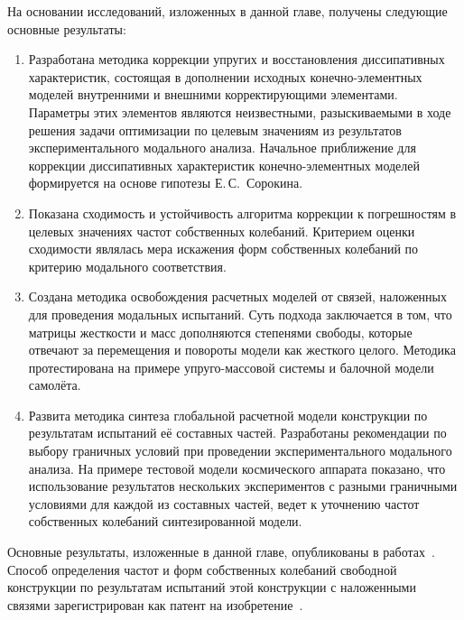 На основании исследований, изложенных в данной главе, получены следующие основные результаты:
\begin{enumerate}
	\item Разработана методика коррекции упругих и восстановления диссипативных характеристик, состоящая в дополнении исходных конечно-элементных моделей внутренними и внешними корректирующими элементами. Параметры этих элементов являются неизвестными, разыскиваемыми в ходе решения задачи оптимизации по целевым значениям из результатов экспериментального модального анализа. Начальное приближение для коррекции диссипативных характеристик конечно-элементных моделей формируется на основе гипотезы Е.\,С.~Сорокина.
	\item Показана сходимость и устойчивость алгоритма коррекции к погрешностям в целевых значениях частот собственных колебаний. Критерием оценки сходимости являлась мера искажения форм собственных колебаний по критерию модального соответствия.
	\item Создана методика освобождения расчетных моделей от связей, наложенных для проведения модальных испытаний. Суть подхода заключается в том, что матрицы жесткости и масс дополняются степенями свободы, которые отвечают за перемещения и повороты модели как жесткого целого. Методика протестирована на примере упруго-массовой системы и балочной модели самолёта.
	\item Развита методика синтеза глобальной расчетной модели конструкции по результатам испытаний её составных частей. Разработаны рекомендации по выбору граничных условий при проведении экспериментального модального анализа. На примере тестовой модели космического аппарата показано, что использование результатов нескольких экспериментов с разными граничными условиями для каждой из составных частей, ведет к уточнению частот собственных колебаний синтезированной модели.
\end{enumerate}

Основные результаты, изложенные в данной главе, опубликованы в работах~\cite{lib:author:iss2018:synthesis, lib:author:spacecraft:cms, lib:author:nstuEn:synthesis, lib:author:samsc:freeing, lib:author:nstuEn:updating, lib:author:iss2019:synthesis, lib:author:nti2019:updating, lib:author:nsu:synthesis, lib:author:nti2020:updating, lib:author:patent:freeing, lib:author:pnrpu:updating}. Способ определения частот и форм собственных колебаний свободной конструкции по результатам испытаний этой конструкции с наложенными связями зарегистрирован как патент на изобретение~.